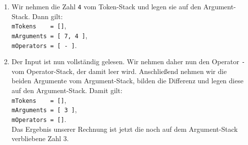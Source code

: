 \begin{enumerate}
\item Wir nehmen die Zahl \texttt{4} vom Token-Stack und legen sie auf den Argument-Stack.
      Dann gilt: \\[0.1cm]
      \hspace*{1.3cm} \texttt{mTokens \ \ \ = []}, \\[0.1cm]
      \hspace*{1.3cm} \texttt{mArguments = [ 7, 4 ]}, \\[0.1cm]
      \hspace*{1.3cm} \texttt{mOperators = [ - ]}. 
\item Der Input ist nun vollst\"andig gelesen.
      Wir nehmen daher nun den Operator \texttt{-} vom Operator-Stack, der damit leer wird.
      Anschlie{\ss}end nehmen wir die beiden Argumente vom Argument-Stack, bilden die
      Differenz und legen diese auf den Argument-Stack.
      Damit gilt: \\[0.1cm]
      \hspace*{1.3cm} \texttt{mTokens \ \ \ = []}, \\[0.1cm]
      \hspace*{1.3cm} \texttt{mArguments = [ 3 ]}, \\[0.1cm]
      \hspace*{1.3cm} \texttt{mOperators = []}. \\[0.1cm]
      Das Ergebnis unserer Rechnung ist jetzt die noch auf dem Argument-Stack verbliebene
      Zahl 3.
\end{enumerate}

